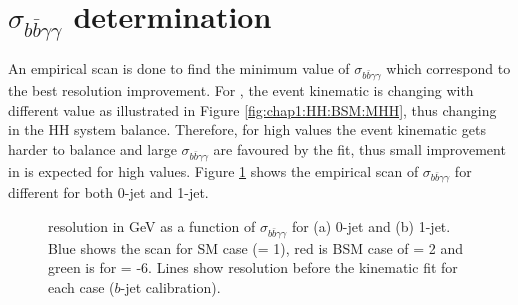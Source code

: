 \section{$\sigma_{b\bar{b}\gamma\gamma}$ determination}
An empirical scan is done to find the minimum value of $\sigma_{b\bar{b}\gamma\gamma}$ which correspond to the best \mbb resolution improvement. For \HHyybb, the event kinematic is changing with different \kl value as illustrated in Figure \ref{fig:chap1:HH:BSM:MHH}, thus changing in the HH system balance. Therefore, for high \kl values the event kinematic gets harder to balance and large $\sigma_{b\bar{b}\gamma\gamma}$ are favoured by the fit, thus small improvement in \mbb is expected for high \kl values. Figure \ref{fig:Adx4:Scan} shows the empirical scan of $\sigma_{b\bar{b}\gamma\gamma}$ for different \kl for both 0-jet and 1-jet. 

\begin{figure}[htbp]
   \centering
   \begin{tcolorbox}[colback=black!5!white,colframe=white!75!black]
   \caption{\mbb resolution in GeV as a function of $\sigma_{b\bar{b}\gamma\gamma}$ for (a) 0-jet and (b) 1-jet. Blue shows the scan for SM case (\kl = 1), red is BSM case of \kl = 2 and green is for \kl = -6. Lines show \mbb resolution before the kinematic fit for each case ($b$-jet calibration).}
   \label{fig:Adx4:Scan}
   \end{tcolorbox}
   
\end{figure}


